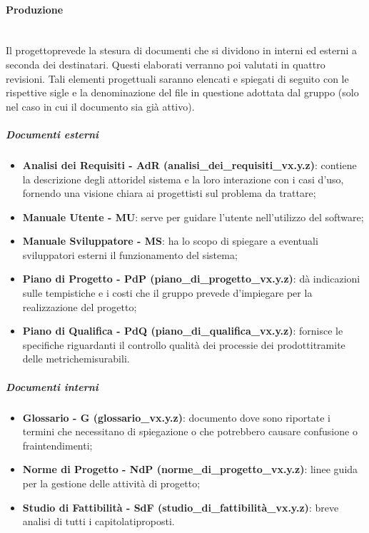             \paragraph{Produzione}\mbox{}\\ [1mm]
                    Il progetto\glosp prevede la stesura di documenti che si dividono in interni ed esterni a seconda dei destinatari. Questi elaborati verranno poi valutati in quattro revisioni. Tali elementi progettuali saranno elencati e spiegati di seguito con le rispettive sigle e la denominazione del file in questione adottata dal gruppo (solo nel caso in cui il documento sia già attivo).
                \subparagraph{Documenti esterni}
                    \begin{itemize}
                        \item \textbf{Analisi dei Requisiti - AdR (analisi\_dei\_requisiti\_vx.y.z)}: contiene la descrizione degli attori\glosp del sistema e la loro interazione con i casi d'uso\glo, fornendo una visione chiara ai progettisti sul problema da trattare;
                        \item \textbf{Manuale Utente - MU}: serve per guidare l'utente nell'utilizzo del software;
                        \item \textbf{Manuale Sviluppatore - MS}: ha lo scopo di spiegare a eventuali sviluppatori esterni il funzionamento
                                                                  del sistema;
                        \item \textbf{Piano di Progetto - PdP (piano\_di\_progetto\_vx.y.z)}: dà indicazioni sulle tempistiche e i costi che il gruppo prevede d'impiegare
                                                                                           per la realizzazione del progetto\glo;
                        \item \textbf{Piano di Qualifica - PdQ (piano\_di\_qualifica\_vx.y.z)}: fornisce le specifiche riguardanti il controllo qualità dei processi\glosp e dei prodotti\glosp tramite delle metriche\glosp misurabili.
                    \end{itemize}
                \subparagraph{Documenti interni}
                    \begin{itemize}
                        \item \textbf{Glossario - G (glossario\_vx.y.z)}: documento dove sono riportate i termini che necessitano di spiegazione o che potrebbero causare confusione o fraintendimenti;
                        \item \textbf{Norme di Progetto - NdP (norme\_di\_progetto\_vx.y.z)}: linee guida per la gestione delle attività di progetto\glo;
                        \item \textbf{Studio di Fattibilità - SdF (studio\_di\_fattibilità\_vx.y.z)}: breve analisi di tutti i capitolati\glosp proposti.
                    \end{itemize}
